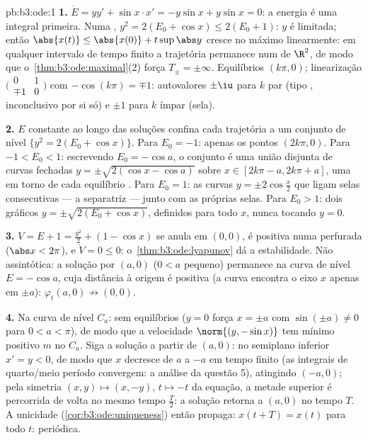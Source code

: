 \begin{solution}{pb:b3:ode:1}
\textbf{1.} $\dot E = yy' + \sin x\cdot x' = -y\sin x +
y\sin x = 0$: a energia é uma integral primeira. Numa
, $y^2 = 2(E_0 + \cos x) \leq 2(E_0 + 1)$: $y$ é
limitada; então $\abs{x(t)} \leq \abs{x(0)} +
t\sup\abs y$ cresce no máximo linearmente: em qualquer intervalo
de tempo finito a trajetória permanece num  de $\R^2$, de modo que
o~\cref{thm:b3:ode:maximal}(2) força $T_\pm = \pm\infty$.
Equilíbrios $(k\pi, 0)$; linearização
$\bigl(\begin{smallmatrix}0&1\\
\mp1&0\end{smallmatrix}\bigr)$ com $-\cos(k\pi) = \mp1$:
autovalores $\pm\iu$ para $k$ par (tipo , inconclusivo
por si só) e $\pm1$ para $k$ ímpar (sela).

\textbf{2.} $E$ constante ao longo das soluções confina cada
trajetória a um conjunto de nível $\{y^2 = 2(E_0 + \cos x)\}$. Para
$E_0 = -1$: apenas os pontos $(2k\pi, 0)$. Para $-1 < E_0 <
1$: escrevendo $E_0 = -\cos a$, o conjunto é uma união disjunta de
curvas fechadas $y = \pm\sqrt{2(\cos x - \cos a)}$ sobre $x \in
[2k\pi - a, 2k\pi + a]$, uma em torno de cada equilíbrio .
Para $E_0 = 1$: as curvas $y = \pm2\cos\frac x2$ que ligam
selas consecutivas --- a separatriz --- junto com as
próprias selas. Para $E_0 > 1$: dois gráficos $y =
\pm\sqrt{2(E_0 + \cos x)}$, definidos para todo $x$, nunca
tocando $y = 0$.

\textbf{3.} $V = E + 1 = \frac{y^2}2 + (1 - \cos x)$
se anula em $(0,0)$, é positiva numa  perfurada
($\abs x < 2\pi$), e $\dot V = 0 \leq 0$:
o~\cref{thm:b3:ode:lyapunov} dá a estabilidade. Não assintótica:
a solução por $(a, 0)$ ($0 < a$ pequeno) permanece na
curva de nível $E = -\cos a$, cuja distância à origem é
positiva (a curva encontra o eixo $x$ apenas em $\pm a$):
$\varphi_t(a, 0) \not\to (0,0)$.

\textbf{4.} Na curva de nível $C_a$: sem equilíbrios ($y = 0$
força $x = \pm a$ com $\sin(\pm a) \neq 0$ para $0 < a <
\pi$), de modo que a velocidade $\norm{(y, -\sin x)}$ tem mínimo positivo
$m$ no  $C_a$. Siga a solução a partir de
$(a, 0)$: no semiplano inferior $x' = y < 0$, de modo que $x$
decresce de $a$ a $-a$ em tempo finito (as integrais de
quarto/meio período convergem: a análise da questão 5), atingindo
$(-a, 0)$; pela simetria $(x, y) \mapsto (x, -y)$, $t
\mapsto -t$ da equação, a metade superior é percorrida
de volta no mesmo tempo $\frac T2$: a solução retorna a
$(a, 0)$ no tempo $T$. A unicidade
(\cref{cor:b3:ode:uniqueness}) então propaga: $x(t + T) =
x(t)$ para todo $t$: periódica.


\end{solution}
